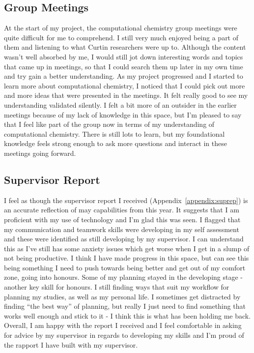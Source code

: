 \documentclass[11pt]{article}
\begin{document}
\subsection{Group Meetings}

At the start of my project, the computational chemistry group meetings were quite difficult for me to comprehend. I still very much enjoyed being a part of them and listening to what Curtin researchers were up to. Although the content wasn't well absorbed by me, I would still jot down interesting words and topics that came up in meetings, so that I could search them up later in my own time and try gain a better understanding. As my project progressed and I started to learn more about computational chemistry, I noticed that I could pick out more and more ideas that were presented in the meetings. It felt really good to see my understanding validated silently. I felt a bit more of an outsider in the earlier meetings because of my lack of knowledge in this space, but I'm pleased to say that I feel like part of the group now in terms of my understanding of computational chemistry. There is still lots to learn, but my foundational knowledge feels strong enough to ask more questions and interact in these meetings going forward.

\subsection{Supervisor Report}

I feel as though the supervisor report I received (Appendix~\ref{appendix:suprep}) is an accurate reflection of may capabilities from this year. It suggests that I am proficient with my use of technology and I'm glad this was seen. I flagged that my communication and teamwork skills were developing in my self assessment and these were identified as still developing by my supervisor. I can understand this as I've still has some anxiety issues which get worse when I get in a slump of not being productive. I think I have made progress in this space, but can see this being something I need to push towards being better and get out of my comfort zone, going into honours. Some of my planning stayed in the developing stage - another key skill for honours. I still finding ways that suit my workflow for planning my studies, as well as my personal life. I sometimes get distracted by finding ``the best way'' of planning, but really I just need to find something that works well enough and stick to it - I think this is what has been holding me back. Overall, I am happy with the report I received and I feel comfortable in asking for advice by my supervisor in regards to developing my skills and I'm proud of the rapport I have built with my supervisor.
\end{document}
